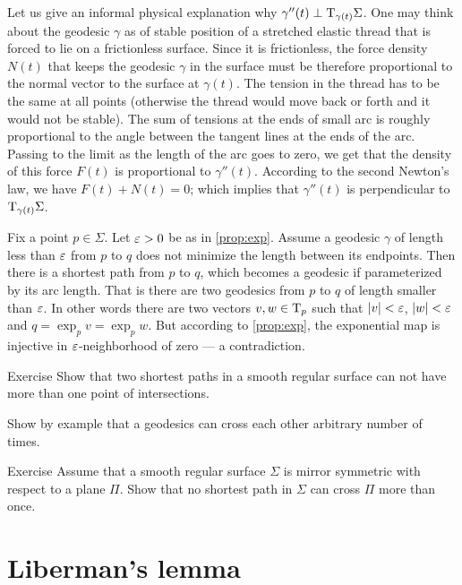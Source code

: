 Let us give an informal physical explanation why $\gamma''(t)\perp\mathrm{T}_{\gamma(t)}\Sigma$.
One may think about the geodesic $\gamma$ as of stable position of a stretched elastic thread that is forced to lie on a frictionless surface.
Since it is frictionless, the force density $N(t)$ that keeps the geodesic $\gamma$ in the surface must be therefore proportional to the normal vector to the surface at $\gamma(t)$.
The tension in the thread has to be the same at all points (otherwise the thread would move back or forth and it would not be stable).
The sum of tensions at the ends of small arc is roughly proportional to the angle between the tangent lines at the ends of the arc. 
Passing to the limit as the length of the arc goes to zero, we get that the density of this force $F(t)$ is proportional to $\gamma''(t)$.
According to the second Newton's law, we have $F(t)+N(t)=0$;
which implies that  $\gamma''(t)$ is perpendicular to $\mathrm{T}_{\gamma(t)}\Sigma$.

Fix a point $p\in\Sigma$.
Let $\varepsilon>0$ be as in \ref{prop:exp}.
Assume a geodesic $\gamma$ of length less than $\varepsilon$ from $p$ to $q$ does not minimize the length between its endpoints.
Then there is a shortest path from $p$ to $q$, which becomes a geodesic if parameterized by its arc length.
That is there are two geodesics from $p$ to $q$ of length smaller than $\varepsilon$.
In other words there are two vectors $v,w\in\mathrm{T}_p$ such that $|v|<\varepsilon$, $|w|<\varepsilon$ and 
$q=\exp_pv=\exp_pw$.
But according to \ref{prop:exp}, the exponential map is injective in $\varepsilon$-neighborhood of zero --- a contradiction.\qeds

\begin{thm}{Exercise}\label{ex:two-min-geod}
Show that two shortest paths in a smooth regular surface  can not have more than one point of intersections.

Show by example that a geodesics can cross each other arbitrary number of times.
\end{thm}

\begin{thm}{Exercise}\label{ex:min-geod+plane}
Assume that a smooth regular surface $\Sigma$ is mirror symmetric with respect to a plane $\Pi$.
Show that no shortest path in $\Sigma$ can cross $\Pi$ more than once.
\end{thm}

\section*{Liberman's lemma}


